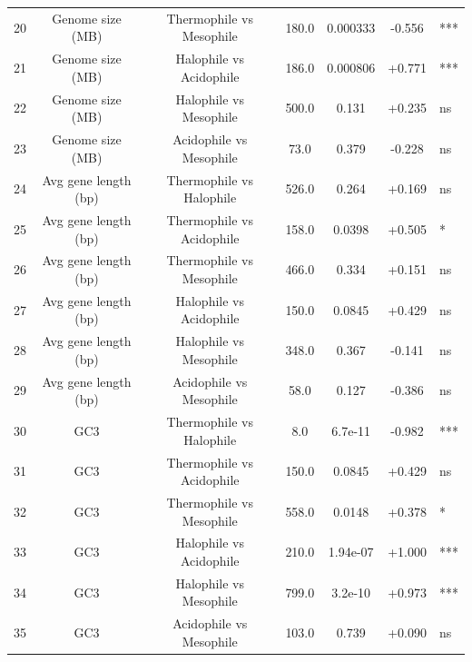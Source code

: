 \begin{table}
\begin{tabular}{lccccc}
20 & Genome size (MB) & Thermophile vs Mesophile & 180.0 & 0.000333 & -0.556 & *** \\
21 & Genome size (MB) & Halophile vs Acidophile & 186.0 & 0.000806 & +0.771 & *** \\
22 & Genome size (MB) & Halophile vs Mesophile & 500.0 & 0.131 & +0.235 & ns \\
23 & Genome size (MB) & Acidophile vs Mesophile & 73.0 & 0.379 & -0.228 & ns \\
24 & Avg gene length (bp) & Thermophile vs Halophile & 526.0 & 0.264 & +0.169 & ns \\
25 & Avg gene length (bp) & Thermophile vs Acidophile & 158.0 & 0.0398 & +0.505 & * \\
26 & Avg gene length (bp) & Thermophile vs Mesophile & 466.0 & 0.334 & +0.151 & ns \\
27 & Avg gene length (bp) & Halophile vs Acidophile & 150.0 & 0.0845 & +0.429 & ns \\
28 & Avg gene length (bp) & Halophile vs Mesophile & 348.0 & 0.367 & -0.141 & ns \\
29 & Avg gene length (bp) & Acidophile vs Mesophile & 58.0 & 0.127 & -0.386 & ns \\
30 & GC3 & Thermophile vs Halophile & 8.0 & 6.7e-11 & -0.982 & *** \\
31 & GC3 & Thermophile vs Acidophile & 150.0 & 0.0845 & +0.429 & ns \\
32 & GC3 & Thermophile vs Mesophile & 558.0 & 0.0148 & +0.378 & * \\
33 & GC3 & Halophile vs Acidophile & 210.0 & 1.94e-07 & +1.000 & *** \\
34 & GC3 & Halophile vs Mesophile & 799.0 & 3.2e-10 & +0.973 & *** \\
35 & GC3 & Acidophile vs Mesophile & 103.0 & 0.739 & +0.090 & ns \\
\bottomrule
\end{tabular}
\end{table}

